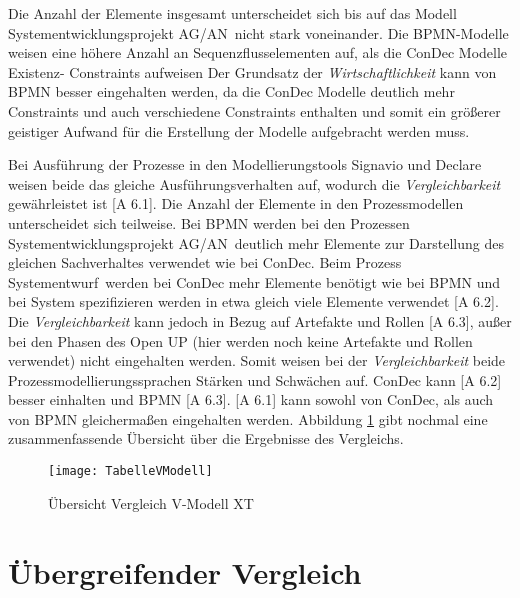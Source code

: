 {Die Anzahl der Elemente insgesamt unterscheidet sich bis auf das Modell \grqq Systementwicklungsprojekt AG/AN\grqq \ nicht stark voneinander. Die BPMN-Modelle weisen eine höhere Anzahl an Sequenzflusselementen auf, als die ConDec Modelle Existenz- Constraints aufweisen
Der Grundsatz der \textit{Wirtschaftlichkeit} kann von BPMN besser eingehalten werden, da die ConDec Modelle deutlich mehr Constraints und auch verschiedene Constraints enthalten und somit ein größerer geistiger Aufwand für die Erstellung der Modelle aufgebracht werden muss.\newline


Bei Ausführung der Prozesse in den Modellierungstools Signavio und Declare weisen beide das gleiche Ausführungsverhalten auf, wodurch die \textit{Vergleichbarkeit} gewährleistet ist [A 6.1]. \newline
Die Anzahl der Elemente in den Prozessmodellen unterscheidet sich teilweise. Bei BPMN werden bei den Prozessen \grqq Systementwicklungsprojekt AG/AN\grqq \ deutlich mehr Elemente zur Darstellung des gleichen Sachverhaltes verwendet wie bei ConDec. Beim Prozess \grqq Systementwurf\grqq \ werden bei ConDec mehr Elemente benötigt wie bei BPMN und bei System spezifizieren werden in etwa gleich viele Elemente verwendet [A 6.2].\newline
Die \textit{Vergleichbarkeit} kann jedoch in Bezug auf Artefakte und Rollen [A 6.3], außer bei den Phasen des Open UP (hier werden noch keine Artefakte und Rollen verwendet) nicht eingehalten werden.\newline
Somit weisen bei der \textit{Vergleichbarkeit} beide Prozessmodellierungssprachen Stärken und Schwächen auf. ConDec kann [A 6.2] besser einhalten und BPMN [A 6.3]. [A 6.1] kann sowohl von ConDec, als auch von BPMN gleichermaßen eingehalten werden. \newline
Abbildung \ref{fig:TabelleVModell} gibt nochmal eine zusammenfassende Übersicht über die Ergebnisse des Vergleichs. 


\begin{figure}[!htbp]
\begin{center}
  \texttt{[image: TabelleVModell]} %
  \caption{Übersicht Vergleich V-Modell XT}
  \label{fig:TabelleVModell}
\end{center}
\end{figure}


\section{Übergreifender Vergleich}

}
